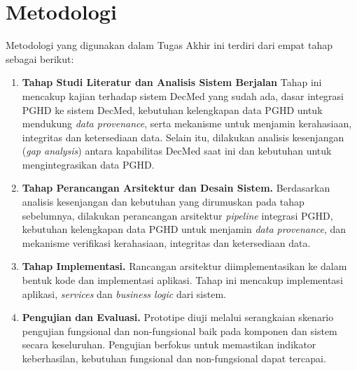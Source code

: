 \section{Metodologi}\label{sec:metodologi}

Metodologi yang digunakan dalam Tugas Akhir ini terdiri dari empat tahap sebagai berikut:

\begin{enumerate}
  \item \textbf{Tahap Studi Literatur dan Analisis Sistem Berjalan}
        Tahap ini mencakup kajian terhadap sistem DecMed yang sudah ada, dasar integrasi PGHD ke sistem DecMed, kebutuhan kelengkapan data PGHD untuk mendukung \textit{data provenance}, serta mekanisme untuk menjamin kerahasiaan, integritas dan ketersediaan data. 
        Selain itu, dilakukan analisis kesenjangan (\textit{gap analysis}) antara kapabilitas DecMed saat ini dan kebutuhan untuk mengintegrasikan data PGHD\@. 
        

  \item \textbf{Tahap Perancangan Arsitektur dan Desain Sistem.}
        Berdasarkan analisis kesenjangan dan kebutuhan yang dirumuskan pada tahap sebelumnya, dilakukan perancangan arsitektur \textit{pipeline} integrasi PGHD, kebutuhan kelengkapan data PGHD untuk menjamin \textit{data provenance}, dan mekanisme verifikasi kerahasiaan, integritas dan ketersediaan data\@.

  \item \textbf{Tahap Implementasi.}
        Rancangan arsitektur diimplementasikan ke dalam bentuk kode dan implementasi aplikasi. 
        Tahap ini mencakup implementasi aplikasi, \textit{services} dan \textit{business logic} dari sistem.

  \item \textbf{Pengujian dan Evaluasi.} 
        Prototipe diuji melalui serangkaian skenario pengujian fungsional dan non-fungsional baik pada komponen dan sistem secara keseluruhan. 
        Pengujian berfokus untuk memastikan indikator keberhasilan, kebutuhan fungsional dan non-fungsional dapat tercapai.
\end{enumerate}